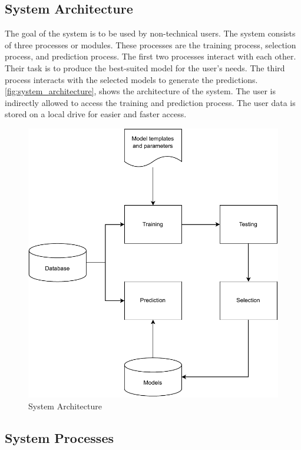 \subsection{System Architecture}\label{subsec:system_architecture}

The goal of the system is to be used by non-technical users. The system consists of three processes or modules. These processes are the training process, selection process, and prediction process. The first two processes interact with each other. Their task is to produce the best-suited model for the user's needs. The third process interacts with the selected models to generate the predictions. \autoref{fig:system_architecture}, shows the architecture of the system. The user is indirectly allowed to access the training and prediction process. The user data is stored on a local drive for easier and faster access.

\begin{figure}[ht]
    \centering
    \includegraphics[width=0.9\columnwidth]{media/sec03/system_architecture.pdf}
    \caption{System Architecture}
    \label{fig:system_architecture}
\end{figure}

\subsection{System Processes}\label{subsec:system_processes}

